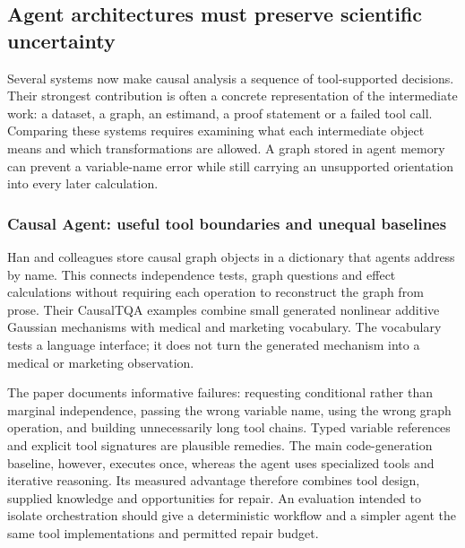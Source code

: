 \hypertarget{agent-architectures-must-preserve-scientific-uncertainty}{%
\subsection{Agent architectures must preserve scientific
uncertainty}\label{agent-architectures-must-preserve-scientific-uncertainty}}

\label{exec13:census-agents}

Several systems now make causal analysis a sequence of tool-supported
decisions. Their strongest contribution is often a concrete
representation of the intermediate work: a dataset, a graph, an
estimand, a proof statement or a failed tool call. Comparing these
systems requires examining what each intermediate object means and which
transformations are allowed. A graph stored in agent memory can prevent
a variable-name error while still carrying an unsupported orientation
into every later calculation.

\hypertarget{causal-agent-useful-tool-boundaries-and-unequal-baselines}{%
\subsubsection{Causal Agent: useful tool boundaries and unequal
baselines}\label{causal-agent-useful-tool-boundaries-and-unequal-baselines}}

Han and colleagues store causal graph objects in a dictionary that
agents address by name. This connects independence tests, graph
questions and effect calculations without requiring each operation to
reconstruct the graph from prose. Their CausalTQA examples combine small
generated nonlinear additive Gaussian mechanisms with medical and
marketing vocabulary. The vocabulary tests a language interface; it does
not turn the generated mechanism into a medical or marketing
observation. \cite{exec13_census_causal_agent}

The paper documents informative failures: requesting conditional rather
than marginal independence, passing the wrong variable name, using the
wrong graph operation, and building unnecessarily long tool chains.
Typed variable references and explicit tool signatures are plausible
remedies. The main code-generation baseline, however, executes once,
whereas the agent uses specialized tools and iterative reasoning. Its
measured advantage therefore combines tool design, supplied knowledge
and opportunities for repair. An evaluation intended to isolate
orchestration should give a deterministic workflow and a simpler agent
the same tool implementations and permitted repair budget.

